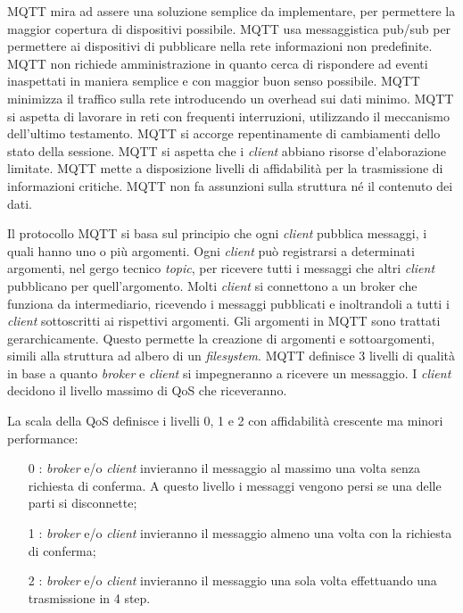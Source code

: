 MQTT mira ad assere una soluzione semplice da implementare, per permettere la maggior copertura di dispositivi possibile.
MQTT usa messaggistica pub/sub per permettere ai dispositivi di pubblicare nella rete informazioni non predefinite.
MQTT non richiede amministrazione in quanto cerca di rispondere ad eventi inaspettati in maniera semplice e con maggior buon senso possibile.
MQTT minimizza il traffico sulla rete introducendo un \gls{overhead} sui dati minimo.
MQTT si aspetta di lavorare in reti con frequenti interruzioni, utilizzando il meccanismo dell'ultimo testamento.
MQTT si accorge repentinamente di cambiamenti dello stato della sessione.
MQTT si aspetta che i \emph{client} abbiano risorse d'elaborazione limitate.
MQTT mette a disposizione livelli di affidabilità per la trasmissione di informazioni critiche.
MQTT non fa assunzioni sulla struttura né il contenuto dei dati.

Il protocollo MQTT si basa sul principio che ogni \emph{client} pubblica messaggi, i quali hanno uno o più argomenti.
Ogni \emph{client} può registrarsi a determinati argomenti, nel gergo tecnico \emph{topic}, per ricevere tutti i messaggi che altri \emph{client} pubblicano per quell'argomento. Molti \emph{client} si connettono a un \gls{broker} che funziona da intermediario, ricevendo i messaggi pubblicati e inoltrandoli a tutti i \emph{client} sottoscritti ai rispettivi argomenti.
Gli argomenti in MQTT sono trattati gerarchicamente. Questo permette la creazione di argomenti e sottoargomenti, simili alla struttura ad albero di un \emph{filesystem}.
MQTT definisce 3 livelli di qualità in base a quanto \emph{broker} e \emph{client} si impegneranno a ricevere un messaggio.
I \emph{client} decidono il livello massimo di \gls{QoS} che riceveranno.

La scala della QoS definisce i livelli 0, 1 e 2 con affidabilità crescente ma minori performance:
\begin{itemize}
	\item [0]: \emph{broker} e/o \emph{client} invieranno il messaggio al massimo una volta senza richiesta di conferma. A questo livello i messaggi vengono persi se una delle parti si disconnette;
	\item [1]: \emph{broker} e/o \emph{client} invieranno il messaggio almeno una volta con la richiesta di conferma;
	\item [2]: \emph{broker} e/o \emph{client} invieranno il messaggio una sola volta effettuando una trasmissione in 4 step.
\end{itemize}

